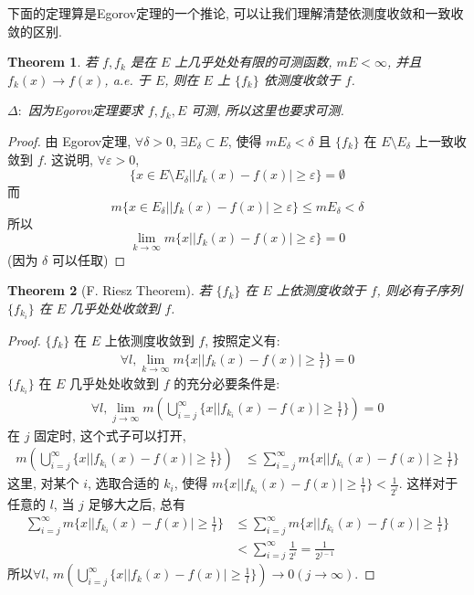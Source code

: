 \documentclass{article}
\newtheorem{theorem}{Theorem}
\begin{document}
下面的定理算是Egorov定理的一个推论, 可以让我们理解清楚依测度收敛和一致收敛的区别.
\begin{theorem}
  若 $f, f_k$ 是在 $E$ 上几乎处处有限的可测函数, $mE < \infty$, 并且 $f_k(x) \to f(x)$, a.e. 于 $E$,
  则在 $E$ 上 $\{f_k\}$ 依测度收敛于 $f$.

  $\Delta:$ 因为Egorov定理要求 $f, f_k, E$ 可测, 所以这里也要求可测.
\end{theorem}
\begin{proof}
  由 Egorov定理, $\forall \delta > 0$, $\exists E_\delta \subset E$, 使得 $mE_\delta < \delta$ 且 $\{f_k\}$ 在 $E\setminus E_\delta$ 上一致收敛到 $f$.
  这说明, $\forall \varepsilon > 0$, 
  \[\{x\in E\setminus E_\delta | |f_k(x) - f(x)| \geq \varepsilon\} = \emptyset\]
  而
  \[m\{x\in E_\delta | |f_k(x) - f(x)| \geq \varepsilon\} \leq  mE_\delta < \delta\]
  所以
  \[\lim_{k\to\infty} m\{x| |f_k(x) - f(x)| \geq \varepsilon\} = 0\] (因为 $\delta$ 可以任取)
\end{proof}

\begin{theorem}[F. Riesz Theorem]
  若 $\{f_k\}$ 在  $E$ 上依测度收敛于 $f$, 则必有子序列 $\{f_{k_i}\}$ 在 $E$ 几乎处处收敛到 $f$.
\end{theorem}
\begin{proof}
  $\{f_k\}$ 在 $E$ 上依测度收敛到 $f$, 按照定义有:
  \begin{align*}
    \forall l, \lim_{k\to\infty}m\{x | |f_k(x) - f(x)| \geq \frac{1}{l}\} = 0
  \end{align*}
  $\{f_{k_i}\}$ 在 $E$ 几乎处处收敛到 $f$ 的充分必要条件是:
  \begin{align*}
    \forall l, \lim_{j\to\infty} m(\bigcup_{i=j}^\infty\{x| |f_{k_i}(x) - f(x)| \geq \frac{1}{l}\}) = 0
  \end{align*}
  在 $j$ 固定时, 这个式子可以打开,
  \begin{align*}
     m(\bigcup_{i=j}^\infty\{x| |f_{k_i}(x) - f(x)| \geq \frac{1}{l}\}) &\leq \sum_{i=j}^\infty m\{x| |f_{k_i}(x) - f(x)| \geq \frac{1}{l}\}
  \end{align*}
  这里, 对某个 $i$, 选取合适的 $k_i$, 使得 $m\{x | |f_{k_i}(x) - f(x)| \geq \frac{1}{i}\} < \frac{1}{2^i}$.
  这样对于任意的 $l$, 当 $j$ 足够大之后, 总有
  \begin{align*}
     \sum_{i=j}^\infty m\{x| |f_{k_i}(x) - f(x)| \geq \frac{1}{l}\}
    &\leq \sum_{i=j}^\infty m\{x| |f_{k_i}(x) - f(x)| \geq \frac{1}{i}\} \\
    &< \sum_{i=j}^\infty \frac{1}{2^i} = \frac{1}{2^{j-1}}
  \end{align*}
  所以$\forall l$, $m(\bigcup_{i=j}^\infty\{x| |f_k(x) - f(x)|\geq \frac {1}{l}\}) \to 0 (j \to \infty)$.
\end{proof}
\end{document}
